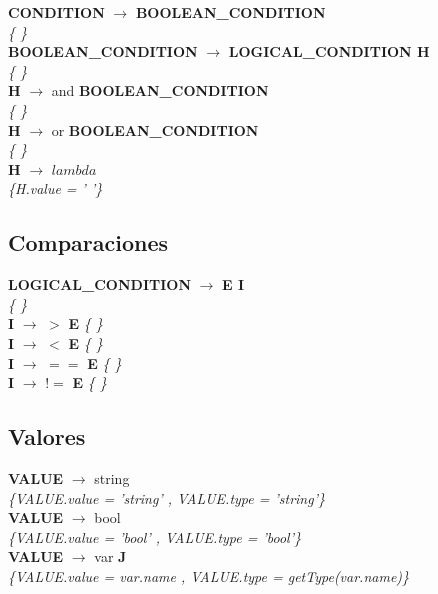\documentclass[10pt,a4paper]{article}
\begin{document}
\textbf{CONDITION} $\rightarrow$ \textbf{BOOLEAN\_CONDITION} \\
\textit{\{   \}} \\

\textbf{BOOLEAN\_CONDITION} $\rightarrow$ \textbf{LOGICAL\_CONDITION H} \\
\textit{\{   \}} \\

\textbf{H} $\rightarrow$ and \textbf{BOOLEAN\_CONDITION} \\
\textit{\{   \}} \\

\textbf{H} $\rightarrow$ or \textbf{BOOLEAN\_CONDITION} \\
\textit{\{   \}} \\

\textbf{H} $\rightarrow$ $lambda$ \\
\textit{\{H.value = ' '\}} \\

\subsection{Comparaciones}
\textbf{LOGICAL\_CONDITION} $\rightarrow$ \textbf{E I} \\
\textit{\{   \}} \\

\textbf{I} $\rightarrow$ $>$ \textbf{E}
\textit{\{   \}} \\

\textbf{I} $\rightarrow$ $<$ \textbf{E}
\textit{\{   \}} \\

\textbf{I} $\rightarrow$ $==$ \textbf{E}
\textit{\{   \}} \\

\textbf{I} $\rightarrow$ $!=$ \textbf{E}
\textit{\{   \}} \\

\subsection{Valores}
\textbf{VALUE} $\rightarrow$ string \\
\textit{\{VALUE.value =  'string' , VALUE.type = 'string'\}} \\


\textbf{VALUE} $\rightarrow$ bool   \\
\textit{\{VALUE.value =  'bool' , VALUE.type = 'bool'\}} \\


\textbf{VALUE} $\rightarrow$ var \textbf{J} \\
\textit{\{VALUE.value =  var.name , VALUE.type = getType(var.name)\}} \\
\end{document}

